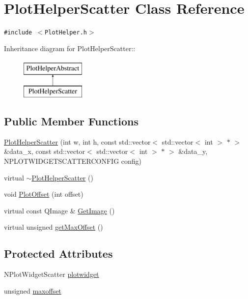 \hypertarget{class_plot_helper_scatter}{
\section{PlotHelperScatter Class Reference}
\label{class_plot_helper_scatter}
}
{\tt \#include $<$PlotHelper.h$>$}

Inheritance diagram for PlotHelperScatter::\begin{figure}[H]
\begin{center}
\leavevmode
\includegraphics[height=2cm]{class_plot_helper_scatter}
\end{center}
\end{figure}
\subsection*{Public Member Functions}
\begin{CompactItemize}
\item 
\hyperlink{class_plot_helper_scatter_558bfa538ebb079e81ffad5d0d2d1cee}{PlotHelperScatter} (int w, int h, const std::vector$<$ std::vector$<$ int $>$ $\ast$ $>$ \&data\_\-x, const std::vector$<$ std::vector$<$ int $>$ $\ast$ $>$ \&data\_\-y, NPLOTWIDGETSCATTERCONFIG config)
\item 
virtual \hyperlink{class_plot_helper_scatter_58ec927ca542928a504050a7f36ce70c}{$\sim$PlotHelperScatter} ()
\item 
void \hyperlink{class_plot_helper_scatter_d8329a5f7890a40448ef89bf32bc422e}{PlotOffset} (int offset)
\item 
virtual const QImage \& \hyperlink{class_plot_helper_scatter_0752a8d97f16327f14a63554ddf79c3a}{GetImage} ()
\item 
virtual unsigned \hyperlink{class_plot_helper_scatter_333fc1f9aa7a867b20b672ea475d704c}{getMaxOffset} ()
\end{CompactItemize}
\subsection*{Protected Attributes}
\begin{CompactItemize}
\item 
NPlotWidgetScatter \hyperlink{class_plot_helper_scatter_c2f3acc7acfa54393536534f108a97a8}{plotwidget}
\item 
unsigned \hyperlink{class_plot_helper_scatter_ea3c4e1dea7ee39f78c1f47c81a072b7}{maxoffset}
\end{CompactItemize}


